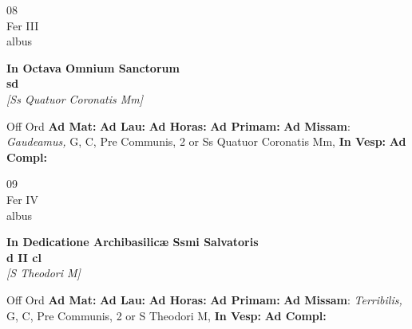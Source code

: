 \documentclass[10pt, openany]{book}
\begin{document}
        \begin{center}
            \begin{minipage}{3.5in}
                \vspace{2em}
                \begin{minipage}{0.5in}
                    {\Huge 08} \\
                    {\normalsize Fer III} \\
                    {\normalsize albus}
                \end{minipage}
                \begin{minipage}{3.0in}
                    \textbf{ \large In Octava Omnium Sanctorum \\
                    \textnormal{\normalsize sd}} \\ \textit{[Ss Quatuor Coronatis Mm]} \\ 
                \end{minipage}
                \begin{justify}Off Ord
                    \textbf{Ad Mat: }
                    \textbf{Ad Lau: }
                    \textbf{Ad Horas: }
                    \textbf{Ad Primam: }\textbf{Ad Missam}: \textit{Gaudeamus,} G, C, Pre Communis, 2 or Ss Quatuor Coronatis Mm,  
                    \textbf{In Vesp: }
                    \textbf{Ad Compl: }
                \end{justify}
            \end{minipage}
        \end{center}
    
        \begin{center}
            \begin{minipage}{3.5in}
                \vspace{2em}
                \begin{minipage}{0.5in}
                    {\Huge 09} \\
                    {\normalsize Fer IV} \\
                    {\normalsize albus}
                \end{minipage}
                \begin{minipage}{3.0in}
                    \textbf{ \large In Dedicatione Archibasilicæ Ssmi Salvatoris \\
                    \textnormal{\normalsize d II cl}} \\ \textit{[S Theodori M]} \\ 
                \end{minipage}
                \begin{justify}Off Ord
                    \textbf{Ad Mat: }
                    \textbf{Ad Lau: }
                    \textbf{Ad Horas: }
                    \textbf{Ad Primam: }\textbf{Ad Missam}: \textit{Terribilis,} G, C, Pre Communis, 2 or S Theodori M,  
                    \textbf{In Vesp: }
                    \textbf{Ad Compl: }
                \end{justify}
            \end{minipage}
        \end{center}
    
\end{document}
